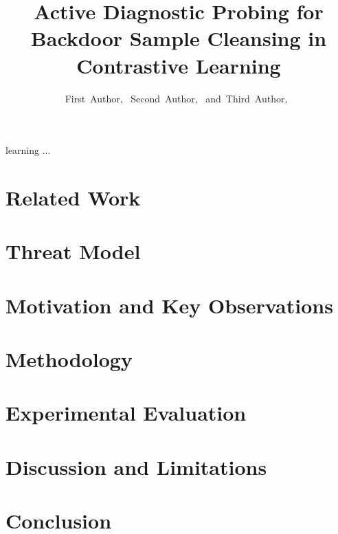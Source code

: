 \documentclass[10pt,journal,compsoc]{IEEEtran}
\begin{document}
\title{Active Diagnostic Probing for Backdoor Sample Cleansing in Contrastive Learning}
\author{First~Author,~
Second~Author,~
and~Third~Author,~%
}
\maketitle
\IEEEdisplaynontitleabstractindextext
\IEEEpeerreviewmaketitle
{}
 learning ...
\section{Related Work}
\section{Threat Model}
\section{Motivation and Key Observations}
\section{Methodology}
\section{Experimental Evaluation}
\section{Discussion and Limitations}
\section{Conclusion}


\end{document}

